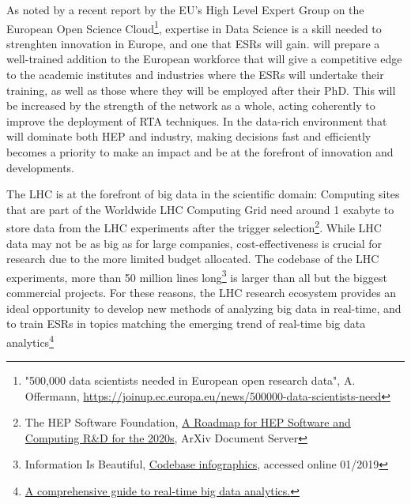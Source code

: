 As noted by a recent report by the EU's High Level Expert Group on the European Open Science Cloud\footnote{"500,000 data scientists needed in European open research data",
A. Offermann, \url{https://joinup.ec.europa.eu/news/500000-data-scientists-need}}, expertise in Data Science is a skill needed to strenghten innovation in Europe, 
and one that \acronym ESRs will gain. 
\acronym will prepare a well-trained addition to the European workforce that will give a competitive edge to the academic institutes and industries where the ESRs will undertake their training, as well as those where they will be employed after their PhD.  
This will be increased by the strength of the network as a whole, acting coherently to improve the deployment of RTA techniques. 
In the data-rich environment that will dominate both HEP and industry, making decisions fast and efficiently becomes a priority to make an impact and
be at the forefront of innovation and developments.  

The LHC is at the forefront of big data in the scientific domain: Computing sites that are part of the Worldwide LHC Computing Grid need around 1 exabyte to store data from the LHC experiments after the trigger selection\footnote{The HEP Software Foundation, \href{https://arxiv.org/pdf/1712.06982.pdf}{A Roadmap for HEP Software and Computing R\&D for the 2020s}, ArXiv Document Server}. 
While LHC data may not be as big as for large companies, cost-effectiveness is crucial for research due to the more limited budget allocated. 
The codebase of the LHC experiments, more than 50 million lines long\footnote{Information Is Beautiful, \href{http://www.informationisbeautiful.net/visualizations/million-lines-of-code/}{Codebase infographics}, accessed online 01/2019} is larger than all but the biggest commercial projects.  
For these reasons, the LHC research ecosystem provides an ideal opportunity to develop new methods of analyzing big data in real-time, and to train ESRs in topics matching the emerging trend of real-time big data analytics\footnote{\href{https://www.scnsoft.com/blog/real-time-big-data-analytics-comprehensive-guide}{A comprehensive guide to real-time big data analytics.}} 



 

